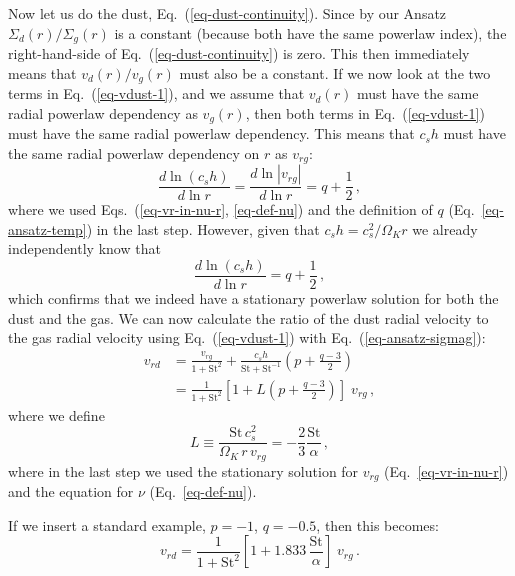 \documentclass{aa}
\def\comma{\,,}
\def\fullstop{\,.}
\begin{document}
Now let us do the dust, Eq.~(\ref{eq-dust-continuity}). Since by our Ansatz
$\Sigma_d(r)/\Sigma_g(r)$ is a constant (because both have the same powerlaw
index), the right-hand-side of Eq.~(\ref{eq-dust-continuity}) is zero. This then
immediately means that $v_d(r)/v_g(r)$ must also be a constant. If we now
look at the two terms in Eq.~(\ref{eq-vdust-1}), and we assume that $v_d(r)$
must have the same radial powerlaw dependency as $v_g(r)$, then both terms in
Eq.~(\ref{eq-vdust-1}) must have the same radial powerlaw dependency.  This
means that $c_sh$ must have the same radial powerlaw dependency on $r$ as
$v_{rg}$:
\begin{equation}
  \frac{d\ln(c_sh)}{d\ln r} = \frac{d\ln |v_{rg}|}{d\ln r} = q+\frac{1}{2}\comma
\end{equation}
where we used Eqs.~(\ref{eq-vr-in-nu-r}, \ref{eq-def-nu}) and the definition of
$q$ (Eq.~\ref{eq-ansatz-temp}) in the last
step. However, given that $c_sh=c_s^2/\Omega_Kr$ we already independently know that
\begin{equation}\label{eq-dlncsh}
  \frac{d\ln(c_sh)}{d\ln r} = q+\frac{1}{2}\comma
\end{equation}
which confirms that we indeed have a stationary powerlaw solution for both the
dust and the gas. We can now calculate the ratio of the dust radial velocity to
the gas radial velocity using Eq.~(\ref{eq-vdust-1}) with
Eq.~(\ref{eq-ansatz-sigmag}):
\begin{equation}\label{eq-vdust-vgas-stationary}
\begin{split}
  v_{rd} &= \frac{v_{rg}}{1+\mathrm{St}^2} 
  + \frac{c_sh}{\mathrm{St}+\mathrm{St}^{-1}}
  \left(p + \frac{q-3}{2}\right)\\
  &= \frac{1}{1+\mathrm{St}^2}\left[1+L\left(p+\frac{q-3}{2}\right)\right] \;v_{rg}\comma
\end{split}
\end{equation}
where we define
\begin{equation}\label{eq-definition-l}
L\equiv \frac{\mathrm{St}\,c_s^2}{\Omega_K\,r\,v_{rg}} = -\frac{2}{3}\frac{\mathrm{St}}{\alpha}\comma
\end{equation}
where in the last step we used the stationary solution for $v_{rg}$
(Eq.~\ref{eq-vr-in-nu-r}) and the equation for $\nu$ (Eq.~\ref{eq-def-nu}).

If we insert a standard example, $p=-1$, $q=-0.5$, then this becomes:
\begin{equation}
v_{rd} = \frac{1}{1+\mathrm{St}^2}\left[1+1.833\,\frac{\mathrm{St}}{\alpha}\right] \;v_{rg}\fullstop
\end{equation}
\end{document}
